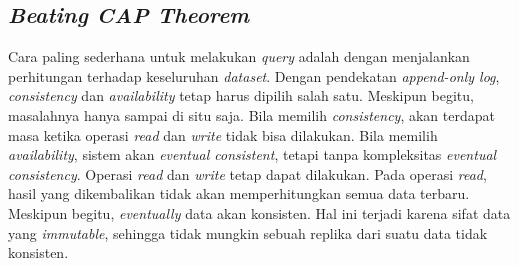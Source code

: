 \subsection{\textit{Beating CAP Theorem}}

Cara paling sederhana untuk melakukan \textit{query} adalah dengan menjalankan perhitungan terhadap keseluruhan \textit{dataset}. Dengan pendekatan \textit{append-only log}, \textit{consistency} dan \textit{availability} tetap harus dipilih salah satu. Meskipun begitu, masalahnya hanya sampai di situ saja. Bila memilih \textit{consistency}, akan terdapat masa ketika operasi \textit{read} dan \textit{write} tidak bisa dilakukan. Bila memilih \textit{availability}, sistem akan \textit{eventual consistent}, tetapi tanpa kompleksitas \textit{eventual consistency}. Operasi \textit{read} dan \textit{write} tetap dapat dilakukan. Pada operasi \textit{read}, hasil yang dikembalikan tidak akan memperhitungkan semua data terbaru. Meskipun begitu, \textit{eventually} data akan konsisten. Hal ini terjadi karena sifat data yang \textit{immutable}, sehingga tidak mungkin sebuah replika dari suatu data tidak konsisten.